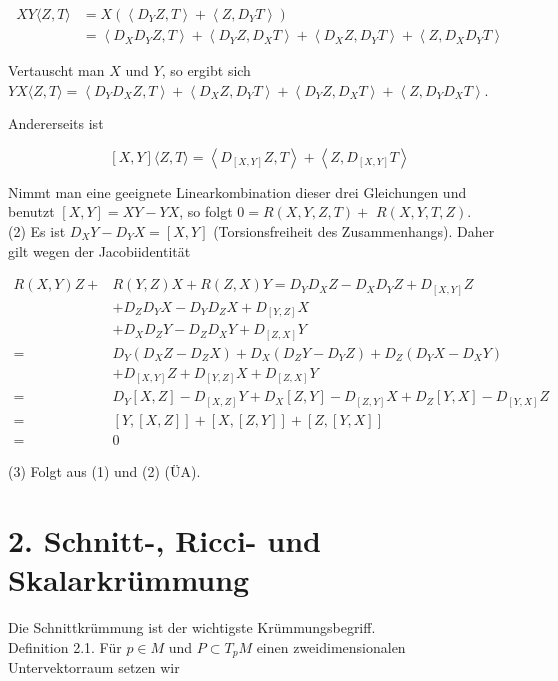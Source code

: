 \documentclass[10pt]{article}
\begin{document}
$$
\begin{aligned}
X Y\langle Z, T\rangle & =X\left(\left\langle D_{Y} Z, T\right\rangle+\left\langle Z, D_{Y} T\right\rangle\right) \\
& =\left\langle D_{X} D_{Y} Z, T\right\rangle+\left\langle D_{Y} Z, D_{X} T\right\rangle+\left\langle D_{X} Z, D_{Y} T\right\rangle+\left\langle Z, D_{X} D_{Y} T\right\rangle
\end{aligned}
$$

Vertauscht man $X$ und $Y$, so ergibt sich\\
$Y X\langle Z, T\rangle=\left\langle D_{Y} D_{X} Z, T\right\rangle+\left\langle D_{X} Z, D_{Y} T\right\rangle+\left\langle D_{Y} Z, D_{X} T\right\rangle+\left\langle Z, D_{Y} D_{X} T\right\rangle$.

Andererseits ist

$$
[X, Y]\langle Z, T\rangle=\left\langle D_{[X, Y]} Z, T\right\rangle+\left\langle Z, D_{[X, Y]} T\right\rangle
$$

Nimmt man eine geeignete Linearkombination dieser drei Gleichungen und benutzt $[X, Y]=X Y-Y X$, so folgt $0=R(X, Y, Z, T)+$ $R(X, Y, T, Z)$.\\
(2) Es ist $D_{X} Y-D_{Y} X=[X, Y]$ (Torsionsfreiheit des Zusammenhangs). Daher gilt wegen der Jacobiidentität

$$
\begin{aligned}
R(X, Y) Z+ & R(Y, Z) X+R(Z, X) Y=D_{Y} D_{X} Z-D_{X} D_{Y} Z+D_{[X, Y]} Z \\
& +D_{Z} D_{Y} X-D_{Y} D_{Z} X+D_{[Y, Z]} X \\
& +D_{X} D_{Z} Y-D_{Z} D_{X} Y+D_{[Z, X]} Y \\
= & D_{Y}\left(D_{X} Z-D_{Z} X\right)+D_{X}\left(D_{Z} Y-D_{Y} Z\right)+D_{Z}\left(D_{Y} X-D_{X} Y\right) \\
& +D_{[X, Y]} Z+D_{[Y, Z]} X+D_{[Z, X]} Y \\
= & D_{Y}[X, Z]-D_{[X, Z]} Y+D_{X}[Z, Y]-D_{[Z, Y]} X+D_{Z}[Y, X]-D_{[Y, X]} Z \\
= & {[Y,[X, Z]]+[X,[Z, Y]]+[Z,[Y, X]] } \\
= & 0
\end{aligned}
$$

(3) Folgt aus (1) und (2) (ÜA).

\section*{2. Schnitt-, Ricci- und Skalarkrümmung}
Die Schnittkrümmung ist der wichtigste Krümmungsbegriff.\\
Definition 2.1. Für $p \in M$ und $P \subset T_{p} M$ einen zweidimensionalen Untervektorraum setzen wir
\end{document}
